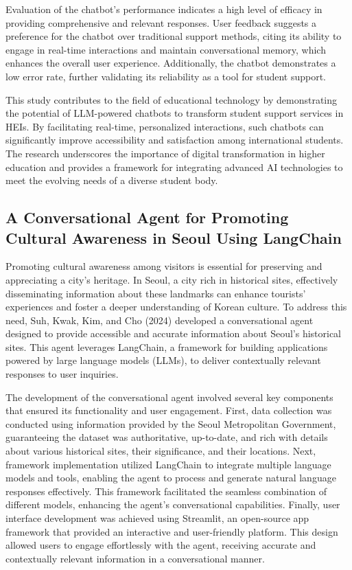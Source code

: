 Evaluation of the chatbot's performance indicates a high level of efficacy in providing comprehensive and relevant responses. User feedback suggests a preference for the chatbot over traditional support methods, citing its ability to engage in real-time interactions and maintain conversational memory, which enhances the overall user experience. Additionally, the chatbot demonstrates a low error rate, further validating its reliability as a tool for student support.

This study contributes to the field of educational technology by demonstrating the potential of LLM-powered chatbots to transform student support services in HEIs. By facilitating real-time, personalized interactions, such chatbots can significantly improve accessibility and satisfaction among international students. The research underscores the importance of digital transformation in higher education and provides a framework for integrating advanced AI technologies to meet the evolving needs of a diverse student body.



\subsection{A Conversational Agent for Promoting Cultural Awareness in Seoul Using LangChain}

\noindent Promoting cultural awareness among visitors is essential for preserving and appreciating a city's heritage. In Seoul, a city rich in historical sites, effectively disseminating information about these landmarks can enhance tourists' experiences and foster a deeper understanding of Korean culture. To address this need, Suh, Kwak, Kim, and Cho (2024) developed a conversational agent designed to provide accessible and accurate information about Seoul's historical sites. This agent leverages LangChain, a framework for building applications powered by large language models (LLMs), to deliver contextually relevant responses to user inquiries.

The development of the conversational agent involved several key components that ensured its functionality and user engagement. First, data collection was conducted using information provided by the Seoul Metropolitan Government, guaranteeing the dataset was authoritative, up-to-date, and rich with details about various historical sites, their significance, and their locations. Next, framework implementation utilized LangChain to integrate multiple language models and tools, enabling the agent to process and generate natural language responses effectively. This framework facilitated the seamless combination of different models, enhancing the agent's conversational capabilities. Finally, user interface development was achieved using Streamlit, an open-source app framework that provided an interactive and user-friendly platform. This design allowed users to engage effortlessly with the agent, receiving accurate and contextually relevant information in a conversational manner.

